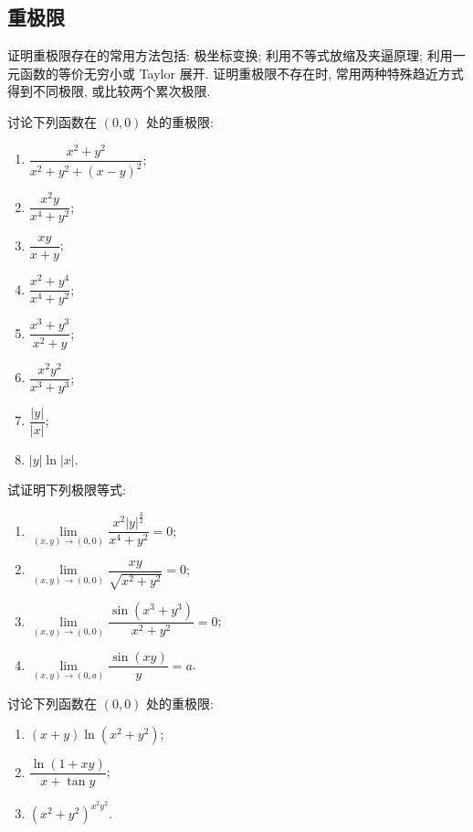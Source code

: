 \documentclass[../../数学分析培优讲义.tex]{subfiles}
\begin{document}
\subsection{重极限}

证明重极限存在的常用方法包括: 极坐标变换; 利用不等式放缩及夹逼原理; 利用一元函数的等价无穷小或 Taylor 展开. 证明重极限不存在时, 常用两种特殊趋近方式得到不同极限, 或比较两个累次极限.

\begin{example}
讨论下列函数在 $(0,0)$ 处的重极限:
\begin{enumerate}[label=(\arabic*)]
    \item $\displaystyle\dfrac{x^2+y^2}{x^2+y^2+(x-y)^2}$;
    \item $\displaystyle\dfrac{x^2y}{x^4+y^2}$;
    \item $\displaystyle\dfrac{xy}{x+y}$;
    \item $\displaystyle\dfrac{x^2+y^4}{x^4+y^2}$;
    \item $\displaystyle\dfrac{x^3+y^3}{x^2+y}$;
    \item $\displaystyle\dfrac{x^2y^2}{x^3+y^3}$;
    \item $\displaystyle\dfrac{|y|}{|x|}$;
    \item $|y|\ln|x|$.
\end{enumerate}
\end{example}
\exampleblank

\begin{example}
试证明下列极限等式:
\begin{enumerate}[label=(\arabic*)]
    \item $\displaystyle\lim\limits_{(x,y)\to(0,0)}\dfrac{x^2|y|^{\frac{3}{2}}}{x^4+y^2}=0$;
    \item $\displaystyle\lim\limits_{(x,y)\to(0,0)}\dfrac{xy}{\sqrt{x^2+y^2}}=0$;
    \item $\displaystyle\lim\limits_{(x,y)\to(0,0)}\dfrac{\sin(x^3+y^3)}{x^2+y^2}=0$;
    \item $\displaystyle\lim\limits_{(x,y)\to(0,a)}\dfrac{\sin(xy)}{y}=a$.
\end{enumerate}
\end{example}
\exampleblank

\begin{example}
讨论下列函数在 $(0,0)$ 处的重极限:
\begin{enumerate}[label=(\arabic*)]
    \item $(x+y)\ln(x^2+y^2)$;
    \item $\displaystyle\dfrac{\ln(1+xy)}{x+\tan y}$;
    \item $(x^2+y^2)^{x^2y^2}$.
\end{enumerate}
\end{example}
\exampleblank
\end{document}
